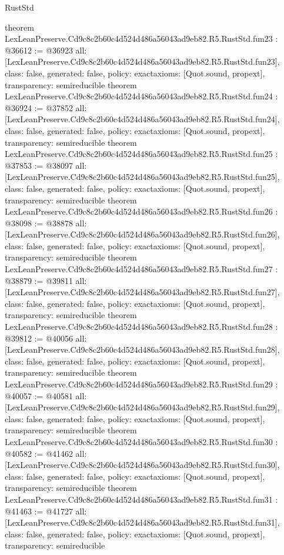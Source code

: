 \begin{lexlean}{RustStd}
\begin{coremodule}
{}
theorem LexLeanPreserve.Cd9c8c2b60c4d524d486a56043ad9eb82.R5.RustStd.fun23 : @36612 := @36923 {
  all: [LexLeanPreserve.Cd9c8c2b60c4d524d486a56043ad9eb82.R5.RustStd.fun23],
  class: false,
  generated: false,
  policy: exact{axioms: [Quot.sound, propext]},
  transparency: semireducible
}
theorem LexLeanPreserve.Cd9c8c2b60c4d524d486a56043ad9eb82.R5.RustStd.fun24 : @36924 := @37852 {
  all: [LexLeanPreserve.Cd9c8c2b60c4d524d486a56043ad9eb82.R5.RustStd.fun24],
  class: false,
  generated: false,
  policy: exact{axioms: [Quot.sound, propext]},
  transparency: semireducible
}
theorem LexLeanPreserve.Cd9c8c2b60c4d524d486a56043ad9eb82.R5.RustStd.fun25 : @37853 := @38097 {
  all: [LexLeanPreserve.Cd9c8c2b60c4d524d486a56043ad9eb82.R5.RustStd.fun25],
  class: false,
  generated: false,
  policy: exact{axioms: [Quot.sound, propext]},
  transparency: semireducible
}
theorem LexLeanPreserve.Cd9c8c2b60c4d524d486a56043ad9eb82.R5.RustStd.fun26 : @38098 := @38878 {
  all: [LexLeanPreserve.Cd9c8c2b60c4d524d486a56043ad9eb82.R5.RustStd.fun26],
  class: false,
  generated: false,
  policy: exact{axioms: [Quot.sound, propext]},
  transparency: semireducible
}
theorem LexLeanPreserve.Cd9c8c2b60c4d524d486a56043ad9eb82.R5.RustStd.fun27 : @38879 := @39811 {
  all: [LexLeanPreserve.Cd9c8c2b60c4d524d486a56043ad9eb82.R5.RustStd.fun27],
  class: false,
  generated: false,
  policy: exact{axioms: [Quot.sound, propext]},
  transparency: semireducible
}
theorem LexLeanPreserve.Cd9c8c2b60c4d524d486a56043ad9eb82.R5.RustStd.fun28 : @39812 := @40056 {
  all: [LexLeanPreserve.Cd9c8c2b60c4d524d486a56043ad9eb82.R5.RustStd.fun28],
  class: false,
  generated: false,
  policy: exact{axioms: [Quot.sound, propext]},
  transparency: semireducible
}
theorem LexLeanPreserve.Cd9c8c2b60c4d524d486a56043ad9eb82.R5.RustStd.fun29 : @40057 := @40581 {
  all: [LexLeanPreserve.Cd9c8c2b60c4d524d486a56043ad9eb82.R5.RustStd.fun29],
  class: false,
  generated: false,
  policy: exact{axioms: [Quot.sound, propext]},
  transparency: semireducible
}
theorem LexLeanPreserve.Cd9c8c2b60c4d524d486a56043ad9eb82.R5.RustStd.fun30 : @40582 := @41462 {
  all: [LexLeanPreserve.Cd9c8c2b60c4d524d486a56043ad9eb82.R5.RustStd.fun30],
  class: false,
  generated: false,
  policy: exact{axioms: [Quot.sound, propext]},
  transparency: semireducible
}
theorem LexLeanPreserve.Cd9c8c2b60c4d524d486a56043ad9eb82.R5.RustStd.fun31 : @41463 := @41727 {
  all: [LexLeanPreserve.Cd9c8c2b60c4d524d486a56043ad9eb82.R5.RustStd.fun31],
  class: false,
  generated: false,
  policy: exact{axioms: [Quot.sound, propext]},
  transparency: semireducible
}
\end{coremodule}
\end{lexlean}
